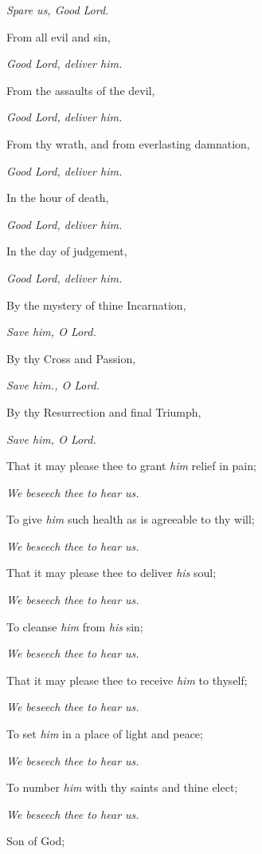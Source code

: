 \qquad\emph{Spare us, Good Lord.}

From all evil and sin,

\qquad\emph{Good Lord, deliver \emph{him.}}

From the assaults of the devil,

\qquad\emph{Good Lord, deliver \emph{him.}}

From thy wrath, and from everlasting damnation,

\qquad\emph{Good Lord, deliver \emph{him.}}

In the hour of death,

\qquad\emph{Good Lord, deliver \emph{him.}}

In the day of judgement,

\qquad\emph{Good Lord, deliver \emph{him.}}

By the mystery of thine Incarnation,

\qquad\emph{Save \emph{him}, O Lord.}

By thy Cross and Passion,

\qquad\emph{Save \emph{him.}, O Lord.}

By thy Resurrection and final Triumph,

\qquad\emph{Save \emph{him}, O Lord.}

That it may please thee to grant \emph{him} relief in pain;

\qquad\emph{We beseech thee to hear us.}

To give \emph{him} such health as is agreeable to thy will;

\qquad\emph{We beseech thee to hear us.}

That it may please thee to deliver \emph{his} soul;

\qquad\emph{We beseech thee to hear us.}

To cleanse \emph{him} from \emph{his} sin;

\qquad\emph{We beseech thee to hear us.}
    
That it may please thee to receive \emph{him} to thyself;

\qquad\emph{We beseech thee to hear us.}

To set \emph{him} in a place of light and peace;

\qquad\emph{We beseech thee to hear us.}

To number \emph{him} with thy saints and thine elect;

\qquad\emph{We beseech thee to hear us.}

Son of God;

